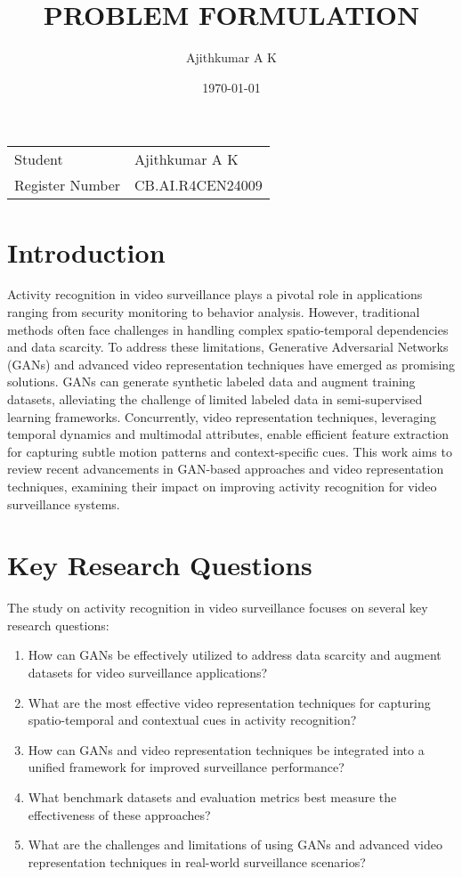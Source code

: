 \documentclass{article}
\title{PROBLEM FORMULATION
}
\author{Ajithkumar A K}
\date{\today}
\begin{document}
\maketitle

\noindent\begin{tabular}{@{}ll}
    Student & Ajithkumar A K \\
     Register Number & CB.AI.R4CEN24009 \\
\end{tabular}

\section*{Introduction}
Activity recognition in video surveillance plays a pivotal role in applications ranging from security monitoring to behavior analysis. However, traditional methods often face challenges in handling complex spatio-temporal dependencies and data scarcity. To address these limitations, Generative Adversarial Networks (GANs) and advanced video representation techniques have emerged as promising solutions. GANs can generate synthetic labeled data and augment training datasets, alleviating the challenge of limited labeled data in semi-supervised learning frameworks. Concurrently, video representation techniques, leveraging temporal dynamics and multimodal attributes, enable efficient feature extraction for capturing subtle motion patterns and context-specific cues. This work aims to review recent advancements in GAN-based approaches and video representation techniques, examining their impact on improving activity recognition for video surveillance systems.

\section*{Key Research Questions}
The study on activity recognition in video surveillance focuses on several key research questions:
\begin{enumerate}
    \item How can GANs be effectively utilized to address data scarcity and augment datasets for video surveillance applications?
    \item What are the most effective video representation techniques for capturing spatio-temporal and contextual cues in activity recognition?
    \item How can GANs and video representation techniques be integrated into a unified framework for improved surveillance performance?
    \item What benchmark datasets and evaluation metrics best measure the effectiveness of these approaches?
    \item What are the challenges and limitations of using GANs and advanced video representation techniques in real-world surveillance scenarios?
\end{enumerate}
\end{document}
